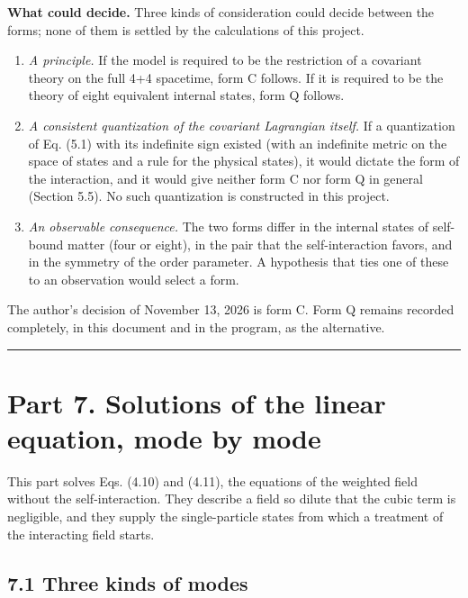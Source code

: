\documentclass[
  10pt,
]{article}
\providecommand{\tightlist}{%
  \setlength{\itemsep}{0pt}\setlength{\parskip}{0pt}}
\begin{document}
\textbf{What could decide.} Three kinds of consideration could decide
between the forms; none of them is settled by the calculations of this
project.

\begin{enumerate}
\def\labelenumi{\arabic{enumi}.}
\tightlist
\item
  \emph{A principle.} If the model is required to be the restriction of
  a covariant theory on the full 4+4 spacetime, form C follows. If it is
  required to be the theory of eight equivalent internal states, form Q
  follows.
\item
  \emph{A consistent quantization of the covariant Lagrangian itself.}
  If a quantization of Eq. (5.1) with its indefinite sign existed (with
  an indefinite metric on the space of states and a rule for the
  physical states), it would dictate the form of the interaction, and it
  would give neither form C nor form Q in general (Section 5.5). No such
  quantization is constructed in this project.
\item
  \emph{An observable consequence.} The two forms differ in the internal
  states of self-bound matter (four or eight), in the pair that the
  self-interaction favors, and in the symmetry of the order parameter. A
  hypothesis that ties one of these to an observation would select a
  form.
\end{enumerate}

The author's decision of November 13, 2026 is form C. Form Q remains
recorded completely, in this document and in the program, as the
alternative.

\begin{center}\rule{0.5\linewidth}{0.5pt}\end{center}

\hypertarget{part-7.-solutions-of-the-linear-equation-mode-by-mode}{%
\section{Part 7. Solutions of the linear equation, mode by
mode}\label{part-7.-solutions-of-the-linear-equation-mode-by-mode}}

This part solves Eqs. (4.10) and (4.11), the equations of the weighted
field without the self-interaction. They describe a field so dilute that
the cubic term is negligible, and they supply the single-particle states
from which a treatment of the interacting field starts.

\hypertarget{three-kinds-of-modes}{%
\subsection{7.1 Three kinds of modes}\label{three-kinds-of-modes}}
\end{document}
